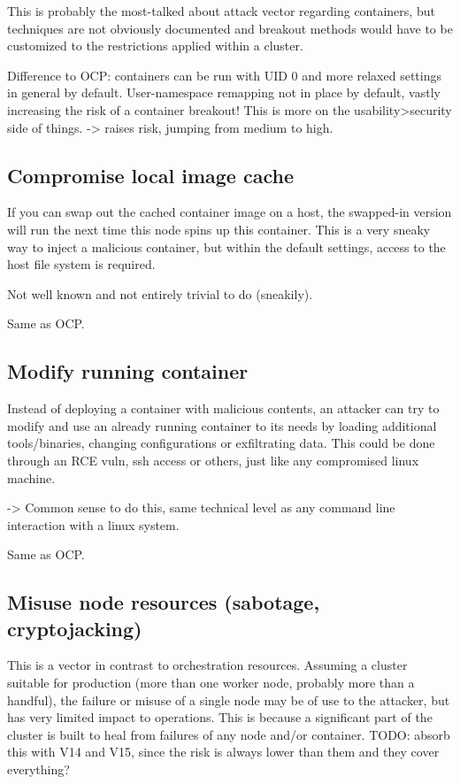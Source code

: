 This is probably the most-talked about attack vector regarding containers, but techniques are not obviously documented and breakout methods would have to be customized to the restrictions applied within a cluster.

Difference to OCP: containers can be run with UID 0 and more relaxed settings in general by default. User-namespace remapping not in place by default, vastly increasing the risk of a container breakout!
This is more on the usability>security side of things. 
-> raises risk, jumping from medium to high.


\subsection{Compromise local image cache}
If you can swap out the cached container image on a host, the swapped-in version will run the next time this node spins up this container.
This is a very sneaky way to inject a malicious container, but within the default settings, access to the host file system is required.

Not well known and not entirely trivial to do (sneakily).

Same as OCP.

\subsection{Modify running container}
Instead of deploying a container with malicious contents, an attacker can try to modify and use an already running container to its needs by loading additional tools/binaries, changing configurations or exfiltrating data. This could be done through an RCE vuln, ssh access or others, just like any compromised linux machine.

-> Common sense to do this, same technical level as any command line interaction with a linux system.

Same as OCP.

\subsection{Misuse node resources (sabotage, cryptojacking)}
This is a vector in contrast to orchestration resources.
Assuming a cluster suitable for production (more than one worker node, probably more than a handful), the failure or misuse of a single node may be of use to the attacker, but has very limited impact to operations. This is because a significant part of the cluster is built to heal from failures of any node and/or container.
TODO: absorb this with V14 and V15, since the risk is always lower than them and they cover everything?

